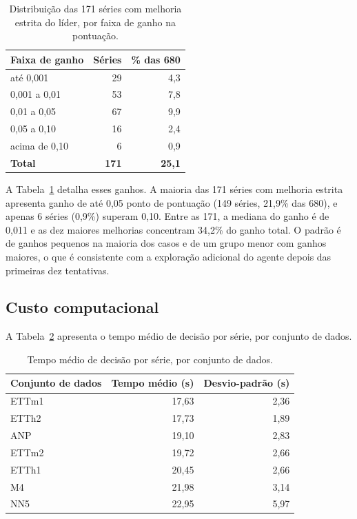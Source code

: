 \begin{table}[H]
\centering
\caption{Distribuição das 171 séries com melhoria estrita do líder, por faixa de ganho na pontuação.}
\label{tab:melhoria-faixas}
\begin{tabular}{@{}lrr@{}}
\toprule
\textbf{Faixa de ganho} & \textbf{Séries} & \textbf{\% das 680} \\
\midrule
até 0,001        & 29  & 4,3  \\
0,001 a 0,01     & 53  & 7,8  \\
0,01 a 0,05      & 67  & 9,9  \\
0,05 a 0,10      & 16  & 2,4  \\
acima de 0,10    & 6   & 0,9  \\
\midrule
\textbf{Total}   & \textbf{171} & \textbf{25,1} \\
\bottomrule
\end{tabular}
\end{table}

A Tabela~\ref{tab:melhoria-faixas} detalha esses ganhos. A maioria das 171 séries com melhoria estrita apresenta ganho de até 0,05 ponto de pontuação (149 séries, 21,9\% das 680), e apenas 6 séries (0,9\%) superam 0,10. Entre as 171, a mediana do ganho é de 0,011 e as dez maiores melhorias concentram 34,2\% do ganho total. O padrão é de ganhos pequenos na maioria dos casos e de um grupo menor com ganhos maiores, o que é consistente com a exploração adicional do agente depois das primeiras dez tentativas.
\subsection{Custo computacional}

A Tabela~\ref{tab:agente-custo} apresenta o tempo médio de decisão por série, por conjunto de dados.

\begin{table}[H]
\centering
\caption{Tempo médio de decisão por série, por conjunto de dados.}
\label{tab:agente-custo}
\begin{tabular}{@{}lrr@{}}
\toprule
\textbf{Conjunto de dados} & \textbf{Tempo médio (s)} & \textbf{Desvio-padrão (s)} \\
\midrule
ETTm1  & 17,63 & 2,36 \\
ETTh2  & 17,73 & 1,89 \\
ANP    & 19,10 & 2,83 \\
ETTm2  & 19,72 & 2,66 \\
ETTh1  & 20,45 & 2,66 \\
M4     & 21,98 & 3,14 \\
NN5    & 22,95 & 5,97 \\
\bottomrule
\end{tabular}
\end{table}

